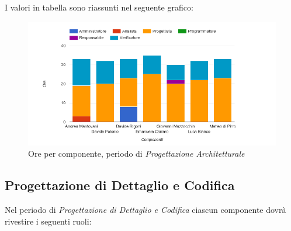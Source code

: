 I valori in tabella sono riassunti nel seguente grafico: \\ 

    \begin{figure}[H]
      \begin{center}
        \includegraphics[width=15cm]{res/img/suddivisioneRuoloProspettoOrario/orePerComponenteProgettazioneArchitetturale.png}
      \caption{Ore per componente, periodo di \textit{Progettazione Architetturale}}
      \end{center} 
    \end{figure}    
    
    
    
    
\pagebreak
\subsection{Progettazione di Dettaglio e Codifica}
Nel periodo di \textit{Progettazione di Dettaglio e Codifica} ciascun componente dovrà rivestire i seguenti ruoli:

